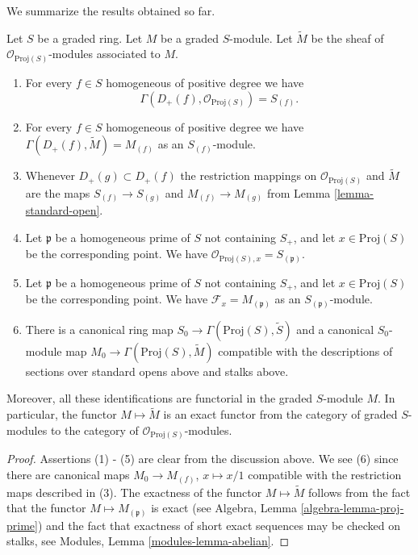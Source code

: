 \noindent
We summarize the results obtained so far.

\begin{lemma}
\label{lemma-proj-sheaves}
Let $S$ be a graded ring. Let $M$ be a graded $S$-module.
Let $\widetilde M$ be the sheaf of $\mathcal{O}_{\text{Proj}(S)}$-modules
associated to $M$.
\begin{enumerate}
\item For every $f \in S$ homogeneous of positive degree we have
$$
\Gamma(D_{+}(f), \mathcal{O}_{\text{Proj}(S)}) = S_{(f)}.
$$
\item For every $f\in S$ homogeneous of positive degree
we have $\Gamma(D_{+}(f), \widetilde M) = M_{(f)}$
as an $S_{(f)}$-module.
\item Whenever $D_{+}(g) \subset D_{+}(f)$ the restriction mappings
on $\mathcal{O}_{\text{Proj}(S)}$ and $\widetilde M$
are the maps
$S_{(f)} \to S_{(g)}$ and $M_{(f)} \to M_{(g)}$ from Lemma
\ref{lemma-standard-open}.
\item Let $\mathfrak p$ be a homogeneous prime of $S$ not containing
$S_{+}$, and let $x \in \text{Proj}(S)$
be the corresponding point. We have
$\mathcal{O}_{\text{Proj}(S), x} = S_{(\mathfrak p)}$.
\item Let $\mathfrak p$ be a homogeneous prime of $S$ not containing
$S_{+}$, and let $x \in \text{Proj}(S)$
be the corresponding point. We have $\mathcal{F}_x = M_{(\mathfrak p)}$
as an $S_{(\mathfrak p)}$-module.
\item
\label{item-map}
There is a canonical ring map
$
S_0 \longrightarrow \Gamma(\text{Proj}(S), \widetilde S)
$
and a canonical $S_0$-module map
$
M_0 \longrightarrow \Gamma(\text{Proj}(S), \widetilde M)
$
compatible with the descriptions of sections over standard opens
above and stalks above.
\end{enumerate}
Moreover, all these identifications are functorial in the graded
$S$-module $M$. In particular, the functor $M \mapsto \widetilde M$
is an exact functor from the category of graded $S$-modules
to the category of $\mathcal{O}_{\text{Proj}(S)}$-modules.
\end{lemma}

\begin{proof}
Assertions (1) - (5) are clear from the discussion above.
We see (6) since there are canonical maps $M_0 \to M_{(f)}$,
$x \mapsto x/1$ compatible with the restriction maps
described in (3). The exactness of the functor $M \mapsto \widetilde M$
follows from the fact that the functor $M \mapsto M_{(\mathfrak p)}$
is exact (see Algebra, Lemma \ref{algebra-lemma-proj-prime})
and the fact that exactness of short exact sequences
may be checked on stalks, see
Modules, Lemma \ref{modules-lemma-abelian}.
\end{proof}

